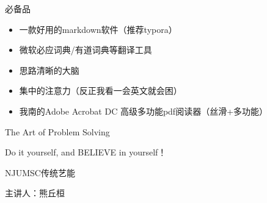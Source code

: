 \documentclass[10pt]{beamer}
\begin{document}
\begin{frame}[fragile]{必备品}
    \begin{itemize}
        \item 一款好用的markdown软件（推荐typora）
        \item 微软必应词典/有道词典等翻译工具
        \item 思路清晰的大脑
        \item 集中的注意力（反正我看一会英文就会困）
        \item 我南的Adobe Acrobat DC 高级多功能pdf阅读器（丝滑+多功能）
    \end{itemize}
\end{frame}

\begin{frame}[standout]

    The Art of Problem Solving

    Do it yourself, and BELIEVE in yourself！

    NJUMSC传统艺能

    主讲人：熊丘桓
    
\end{frame}
\end{document}
